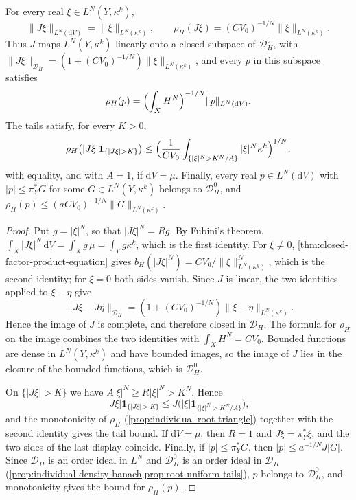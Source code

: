 \begin{proposition}\label{prop:closed-factor-root-subspace}
For every real $\xi\in L^N(Y,\kappa^k)$,
\[
 \|J\xi\|_{L^N(\mathrm{d}V)}=\|\xi\|_{L^N(\kappa^k)},\qquad
 \rho_H(J\xi)=(CV_0)^{-1/N}\|\xi\|_{L^N(\kappa^k)}.
\]
Thus $J$ maps $L^N(Y,\kappa^k)$ linearly onto a closed subspace of $\mathcal D_H^0$, with $\|J\xi\|_{\mathcal D_H}=(1+(CV_0)^{-1/N})\|\xi\|_{L^N(\kappa^k)}$, and every $p$ in this subspace satisfies
\[
 \rho_H(p)=\Bigl(\int_XH^N\Bigr)^{-1/N}\|p\|_{L^N(\mathrm{d}V)}.
\]
The tails satisfy, for every $K>0$,
\[
 \rho_H\bigl(|J\xi|\mathbf1_{\{|J\xi|>K\}}\bigr)
 \leq\Bigl(\frac1{CV_0}\int_{\{|\xi|^N>K^N/A\}}|\xi|^N\kappa^k\Bigr)^{1/N},
\]
with equality, and with $A=1$, if $\mathrm{d}V=\mu$. Finally, every real $p\in L^N(\mathrm{d}V)$ with $|p|\leq\pi_Y^*G$ for some $G\in L^N(Y,\kappa^k)$ belongs to $\mathcal D_H^0$, and $\rho_H(p)\leq(aCV_0)^{-1/N}\|G\|_{L^N(\kappa^k)}$.
\end{proposition}
\begin{proof}
Put $g=|\xi|^N$, so that $|J\xi|^N=Rg$. By Fubini's theorem, $\int_X|J\xi|^N\,\mathrm{d}V=\int_Xg\,\mu=\int_Yg\kappa^k$, which is the first identity. For $\xi\ne0$, \cref{thm:closed-factor-product-equation} gives $b_H(|J\xi|^N)=CV_0/\|\xi\|_{L^N(\kappa^k)}^N$, which is the second identity; for $\xi=0$ both sides vanish. Since $J$ is linear, the two identities applied to $\xi-\eta$ give
\[
 \|J\xi-J\eta\|_{\mathcal D_H}=(1+(CV_0)^{-1/N})\|\xi-\eta\|_{L^N(\kappa^k)}.
\]
Hence the image of $J$ is complete, and therefore closed in $\mathcal D_H$. The formula for $\rho_H$ on the image combines the two identities with $\int_XH^N=CV_0$. Bounded functions are dense in $L^N(Y,\kappa^k)$ and have bounded images, so the image of $J$ lies in the closure of the bounded functions, which is $\mathcal D_H^0$.

On $\{|J\xi|>K\}$ we have $A|\xi|^N\geq R|\xi|^N>K^N$. Hence
\[
 |J\xi|\mathbf1_{\{|J\xi|>K\}}\leq J\bigl(|\xi|\mathbf1_{\{|\xi|^N>K^N/A\}}\bigr),
\]
and the monotonicity of $\rho_H$ (\cref{prop:individual-root-triangle}) together with the second identity gives the tail bound. If $\mathrm{d}V=\mu$, then $R=1$ and $J\xi=\pi_Y^*\xi$, and the two sides of the last display coincide. Finally, if $|p|\leq\pi_Y^*G$, then $|p|\leq a^{-1/N}J|G|$. Since $\mathcal D_H$ is an order ideal in $L^N$ and $\mathcal D_H^0$ is an order ideal in $\mathcal D_H$ (\cref{prop:individual-density-banach,prop:root-uniform-tails}), $p$ belongs to $\mathcal D_H^0$, and monotonicity gives the bound for $\rho_H(p)$.
\end{proof}

